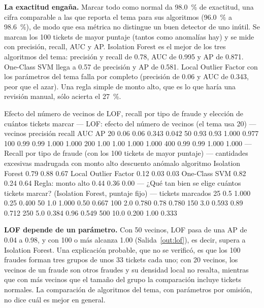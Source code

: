 \documentclass[11pt,letterpaper]{article}
\begin{document}
\textbf{La exactitud engaña.} Marcar todo como normal da 98.0~\% de exactitud, una cifra comparable a las que reporta el tema para sus algoritmos (96.0~\% a 98.6~\%), de modo que esa métrica no distingue un buen detector de uno inútil. Se marcan los 100 tickets de mayor puntaje (tantos como anomalías hay) y se mide con precisión, recall, AUC y AP. Isolation Forest es el mejor de los tres algoritmos del tema: precisión y recall de 0.78, AUC de 0.995 y AP de 0.871. One-Class SVM llega a 0.57 de precisión y AP de 0.581. Local Outlier Factor con los parámetros del tema falla por completo (precisión de 0.06 y AUC de 0.343, peor que el azar). Una regla simple de monto alto, que es lo que haría una revisión manual, sólo acierta el 27~\%.

\begin{consola}[label=out:lof]{Efecto del número de vecinos de LOF, recall por tipo de fraude y elección de cuántos tickets marcar}
--- LOF: efecto del número de vecinos (el tema usa 20) ---
 vecinos  precisión  recall   AUC    AP
      20       0.06    0.06 0.343 0.042
      50       0.93    0.93 1.000 0.977
     100       0.99    0.99 1.000 1.000
     200       1.00    1.00 1.000 1.000
     400       0.99    0.99 1.000 1.000
--- Recall por tipo de fraude (con los 100 tickets de mayor puntaje) ---
                      cantidades excesivas  madrugada con monto alto  descuento anómalo
algoritmo
Isolation Forest                      0.79                      0.88               0.67
Local Outlier Factor                  0.12                      0.03               0.03
One-Class SVM                         0.82                      0.24               0.64
Regla: monto alto                     0.44                      0.36               0.00
--- ¿Qué tan bien se elige cuántos tickets marcar? (Isolation Forest, puntaje fijo) ---
 tickets marcados  %
               25               0.5      1.000    0.25 0.400
               50               1.0      1.000    0.50 0.667
              100               2.0      0.780    0.78 0.780
              150               3.0      0.593    0.89 0.712
              250               5.0      0.384    0.96 0.549
              500              10.0      0.200    1.00 0.333
\end{consola}

\textbf{LOF depende de un parámetro.} Con 50 vecinos, LOF pasa de una AP de 0.04 a 0.98, y con 100 o más alcanza 1.00 (Salida~\ref{out:lof}), es decir, supera a Isolation Forest. Una explicación probable, que no se verificó, es que los 100 fraudes forman tres grupos de unos 33 tickets cada uno; con 20 vecinos, los vecinos de un fraude son otros fraudes y su densidad local no resalta, mientras que con más vecinos que el tamaño del grupo la comparación incluye tickets normales. La comparación de algoritmos del tema, con parámetros por omisión, no dice cuál es mejor en general.
\end{document}
